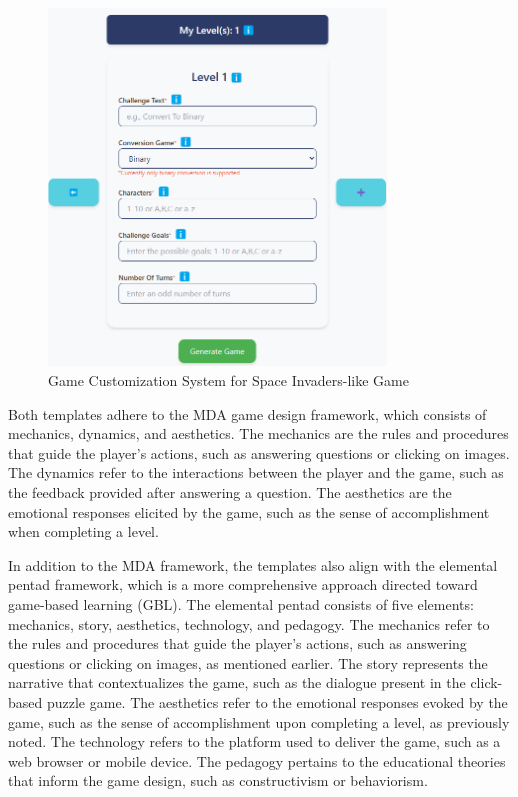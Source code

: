 \begin{figure}
	\centering
	\includegraphics[width=0.8\textwidth]{figures/Space_Invaders/Instructor_Portal_Space_Invader.png}
	\caption{Game Customization System for Space Invaders-like Game}
	\label{fig:customizationSpaceInvaders}
\end{figure}



Both templates adhere to the MDA game design framework, which consists of mechanics, dynamics, and aesthetics. The mechanics are the rules and procedures that guide the player's actions, such as answering questions or clicking on images. The dynamics refer to the interactions between the player and the game, such as the feedback provided after answering a question. The aesthetics are the emotional responses elicited by the game, such as the sense of accomplishment when completing a level.

In addition to the MDA framework, the templates also align with the elemental pentad framework, which is a more comprehensive approach directed toward game-based learning (GBL). The elemental pentad consists of five elements: mechanics, story, aesthetics, technology, and pedagogy. The mechanics refer to the rules and procedures that guide the player's actions, such as answering questions or clicking on images, as mentioned earlier. The story represents the narrative that contextualizes the game, such as the dialogue present in the click-based puzzle game. The aesthetics refer to the emotional responses evoked by the game, such as the sense of accomplishment upon completing a level, as previously noted. The technology refers to the platform used to deliver the game, such as a web browser or mobile device. The pedagogy pertains to the educational theories that inform the game design, such as constructivism or behaviorism.

